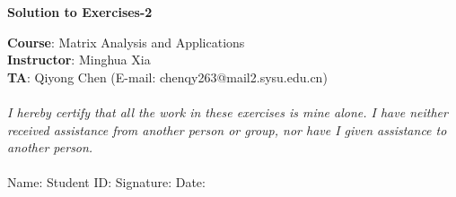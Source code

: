 \documentclass[12pt, a4paper, UTF8]{ctexart}
\begin{document}
	
	\begin{center} \large \textbf{Solution to Exercises-2} \end{center}
	
	\begin{flushleft} 
		
		\textbf{Course}: Matrix Analysis and Applications\\
		
		\textbf{Instructor}: Minghua Xia\\
		
		\textbf{TA}: Qiyong Chen (E-mail: chenqy263@mail2.sysu.edu.cn)\\
		
		\ \\
		
		\textit{I hereby certify that all the work in these exercises is mine alone. I have neither received assistance from another person or group, nor have I given assistance to another person.}\\
		
		\ \\
		

		
		\noindent Name:\underline{\qquad\qquad\qquad} \quad Student ID:\underline{\qquad\qquad\qquad} \quad
		Signature:\underline{\qquad\qquad\qquad} \quad Date:\underline{\qquad\qquad\qquad} \\
		
	\end{flushleft}
	
	
	
\end{document}

